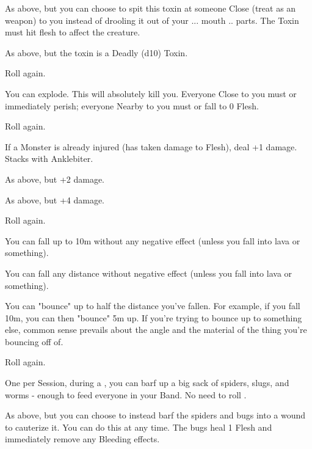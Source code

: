 \begin{multicols*}{2}
 As above, but you can choose to spit this toxin at someone Close (treat as an \INT weapon) to you instead of drooling it out of your ... mouth .. parts. The Toxin must hit flesh to affect the creature. 

 As above, but the toxin is a Deadly (d10) Toxin.

 Roll again.

\NC[Name=Big Boom]

 You can explode.  This will absolutely kill you.  Everyone Close to you must  or immediately perish; everyone Nearby to you must  or fall to 0 Flesh.

 Roll again.

\newpage


\NC[Name=Bloodthirst]

 If a Monster is already injured (has taken damage to Flesh), deal +1 damage.  Stacks with Anklebiter.

 As above, but +2 damage.

 As above, but +4 damage.

 Roll again.


\NC[Name=Bouncy]

 You can fall up to 10m without any negative effect (unless you fall into lava or something).

 You can fall any distance without negative effect (unless you fall into lava or something).

 You can "bounce" up to half the distance you've fallen.  For example, if you fall 10m, you can then "bounce" 5m up.  If you're trying to bounce up to something else, common sense prevails about the angle and the material of the thing you're bouncing off of.

 Roll again.



\NC[Name=Bug Barf]

 One per Session, during a , you can barf up a big sack of spiders, slugs, and worms - enough to feed everyone in your Band. No need to roll .

 As above, but you can choose to instead barf the spiders and bugs into a wound to cauterize it. You can do this at any time. The bugs heal 1 Flesh and immediately remove any Bleeding effects.


\end{multicols*}
